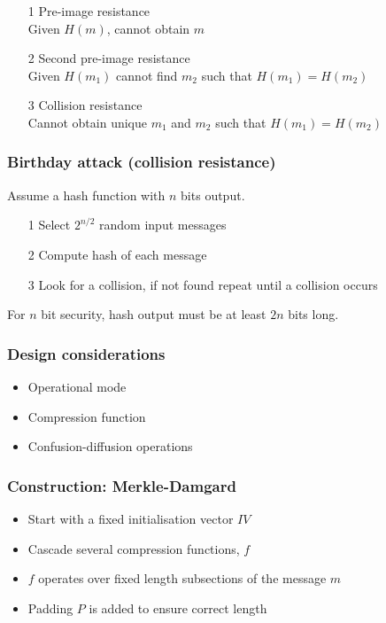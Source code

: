 \documentclass[a4paper]{article}
\begin{document}
\begin{enumerate}
  \item[1]
    Pre-image resistance \\
    Given $H(m)$, cannot obtain $m$
  \item[2]
    Second pre-image resistance \\
    Given $H(m_{1})$ cannot find $m_{2}$ such that $H(m_{1}) = H(m_{2})$
  \item[3]
    Collision resistance \\
    Cannot obtain unique $m_{1}$ and $m_{2}$ such that $H(m_{1}) = H(m_{2})$
\end{enumerate}

\subsubsection{Birthday attack (collision resistance)}

Assume a hash function with $n$ bits output.

\begin{enumerate}
  \item[1] Select $2^{n/2}$ random input messages
  \item[2] Compute hash of each message
  \item[3] Look for a collision, if not found repeat until a collision occurs
\end{enumerate}

For $n$ bit security, hash output must be at least $2n$ bits long.

\subsubsection{Design considerations}

\begin{itemize}
  \item Operational mode
  \item Compression function
  \item Confusion-diffusion operations
\end{itemize}

\subsubsection{Construction: Merkle-Damgard}

\begin{itemize}
  \item Start with a fixed initialisation vector $IV$
  \item Cascade several compression functions, $f$
  \item $f$ operates over fixed length subsections of the message $m$
  \item Padding $P$ is added to ensure correct length
\end{itemize}
\end{document}
